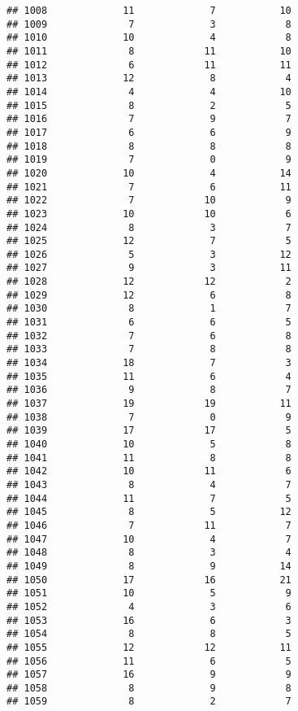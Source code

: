 \documentclass[
]{article}
\begin{document}
\begin{verbatim}
## 1008             11             7           10
## 1009              7             3            8
## 1010             10             4            8
## 1011              8            11           10
## 1012              6            11           11
## 1013             12             8            4
## 1014              4             4           10
## 1015              8             2            5
## 1016              7             9            7
## 1017              6             6            9
## 1018              8             8            8
## 1019              7             0            9
## 1020             10             4           14
## 1021              7             6           11
## 1022              7            10            9
## 1023             10            10            6
## 1024              8             3            7
## 1025             12             7            5
## 1026              5             3           12
## 1027              9             3           11
## 1028             12            12            2
## 1029             12             6            8
## 1030              8             1            7
## 1031              6             6            5
## 1032              7             6            8
## 1033              7             8            8
## 1034             18             7            3
## 1035             11             6            4
## 1036              9             8            7
## 1037             19            19           11
## 1038              7             0            9
## 1039             17            17            5
## 1040             10             5            8
## 1041             11             8            8
## 1042             10            11            6
## 1043              8             4            7
## 1044             11             7            5
## 1045              8             5           12
## 1046              7            11            7
## 1047             10             4            7
## 1048              8             3            4
## 1049              8             9           14
## 1050             17            16           21
## 1051             10             5            9
## 1052              4             3            6
## 1053             16             6            3
## 1054              8             8            5
## 1055             12            12           11
## 1056             11             6            5
## 1057             16             9            9
## 1058              8             9            8
## 1059              8             2            7

\end{verbatim}
\end{document}
